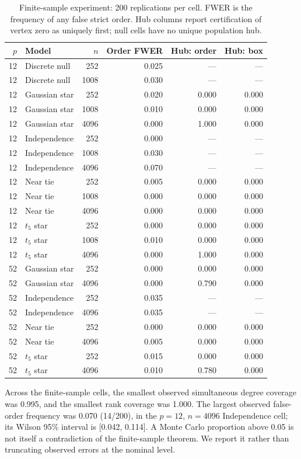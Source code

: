\begin{table}[htbp]
\caption{Finite-sample experiment: 200 replications per cell. FWER is the frequency of any false strict order. Hub columns report certification of vertex zero as uniquely first; null cells have no unique population hub.}\label{tab:exact}
\centering\small
\begin{tabular}{rlrrrr}
\toprule
$p$ & Model & $n$ & Order FWER & Hub: order & Hub: box \\
\midrule
12 & Discrete null & 252 & 0.025 & --- & --- \\
12 & Discrete null & 1008 & 0.030 & --- & --- \\
12 & Gaussian star & 252 & 0.020 & 0.000 & 0.000 \\
12 & Gaussian star & 1008 & 0.010 & 0.000 & 0.000 \\
12 & Gaussian star & 4096 & 0.000 & 1.000 & 0.000 \\
12 & Independence & 252 & 0.000 & --- & --- \\
12 & Independence & 1008 & 0.030 & --- & --- \\
12 & Independence & 4096 & 0.070 & --- & --- \\
12 & Near tie & 252 & 0.005 & 0.000 & 0.000 \\
12 & Near tie & 1008 & 0.000 & 0.000 & 0.000 \\
12 & Near tie & 4096 & 0.000 & 0.000 & 0.000 \\
12 & $t_5$ star & 252 & 0.000 & 0.000 & 0.000 \\
12 & $t_5$ star & 1008 & 0.010 & 0.000 & 0.000 \\
12 & $t_5$ star & 4096 & 0.000 & 1.000 & 0.000 \\
52 & Gaussian star & 252 & 0.000 & 0.000 & 0.000 \\
52 & Gaussian star & 4096 & 0.000 & 0.790 & 0.000 \\
52 & Independence & 252 & 0.035 & --- & --- \\
52 & Independence & 4096 & 0.035 & --- & --- \\
52 & Near tie & 252 & 0.000 & 0.000 & 0.000 \\
52 & Near tie & 4096 & 0.005 & 0.000 & 0.000 \\
52 & $t_5$ star & 252 & 0.015 & 0.000 & 0.000 \\
52 & $t_5$ star & 4096 & 0.010 & 0.780 & 0.000 \\
\bottomrule
\end{tabular}
\end{table}
Across the finite-sample cells, the smallest observed simultaneous degree coverage was 0.995, and the smallest rank coverage was 1.000. The largest observed false-order frequency was 0.070 (14/200), in the $p=12$, $n=4096$ Independence cell; its Wilson 95\% interval is [0.042, 0.114]. A Monte Carlo proportion above 0.05 is not itself a contradiction of the finite-sample theorem. We report it rather than truncating observed errors at the nominal level.

